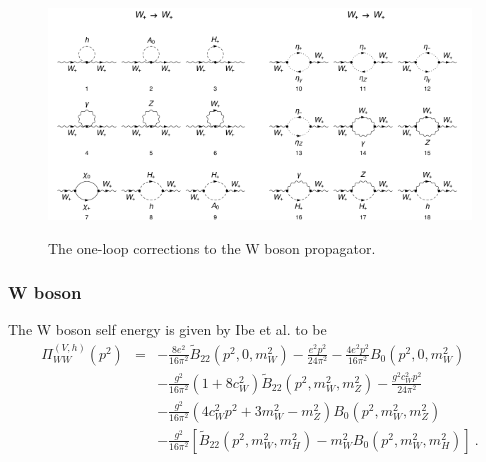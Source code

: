 \documentclass[11pt]{article}
\begin{document}
\begin{figure}[h!]
\center
\includegraphics[width=0.5\textwidth]{diagrams_V[3]_1_1.pdf}\includegraphics[width=0.5\textwidth]{diagrams_V[3]_1_2.pdf}
\caption{The one-loop corrections to the W boson propagator.}\label{fig:WW}
\end{figure}

\subsubsection{W boson}
The W boson self energy is given by Ibe et al. \cite{Ibe2013a} to be
{\small
\begin{eqnarray}
\Pi_{WW}^{(V, h)}(p^2) &=&
-\frac{8e^2}{16\pi^2} \tilde B_{22}(p^2, 0, m_W^2)
-\frac{e^2 p^2}{24\pi^2}
-\frac{4e^2 p^2}{16\pi^2} B_0(p^2, 0, m_W^2) \nonumber \\
&& -\frac{g^2}{16\pi^2}(1 + 8c_W^2)
\tilde{B}_{22}(p^2, m_W^2, m_Z^2)
-\frac{g^2 c_W^2 p^2}{24\pi^2} \nonumber \\
&& -\frac{ g^2}{16\pi^2}( 4  c_W^2 p^2 + 3 m_W^2 -  m_Z^2) B_0( p^2,m_W^2, m_Z^2) \nonumber\\
&& -\frac{g^2}{16\pi^2}
[ \tilde{B}_{22}(p^2, m_W^2, m_H^2)
-m_W^2 B_0(p^2, m_W^2, m_H^2) ]\ .\label{eqn:WW}
\end{eqnarray}
}
\end{document}
